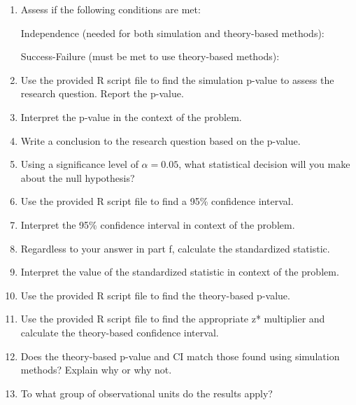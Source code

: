 \documentclass[
]{report}
\begin{document}
\vspace{2in}

\newpage

\begin{enumerate}
\def\labelenumi{\alph{enumi}.}
\setcounter{enumi}{5}
\item
  Assess if the following conditions are met:

  Independence (needed for both simulation and theory-based methods):
  \vspace{0.5in}

  Success-Failure (must be met to use theory-based methods):
  \vspace{0.6in}
\item
  Use the provided R script file to find the simulation p-value to assess the research question. Report the p-value.
  \vspace{0.2in}
\item
  Interpret the p-value in the context of the problem.
  \vspace{0.8in}
\item
  Write a conclusion to the research question based on the p-value.
  \vspace{0.8in}
\item
  Using a significance level of \(\alpha = 0.05\), what statistical decision will you make about the null hypothesis?
  \vspace{0.3in}
\item
  Use the provided R script file to find a 95\% confidence interval.
  \vspace{0.4in}
\item
  Interpret the 95\% confidence interval in context of the problem.
  \vspace{0.8in}
\item
  Regardless to your answer in part f, calculate the standardized statistic.
  \vspace{0.8in}
\item
  Interpret the value of the standardized statistic in context of the problem.
  \vspace{0.8in}
\item
  Use the provided R script file to find the theory-based p-value.
  \vspace{0.3in}
\item
  Use the provided R script file to find the appropriate z* multiplier and calculate the theory-based confidence interval.
  \vspace{0.8in}
\item
  Does the theory-based p-value and CI match those found using simulation methods? Explain why or why not.
  \vspace{0.8in}
\item
  To what group of observational units do the results apply?
  \vspace{0.8in}
\end{enumerate}
\end{document}
